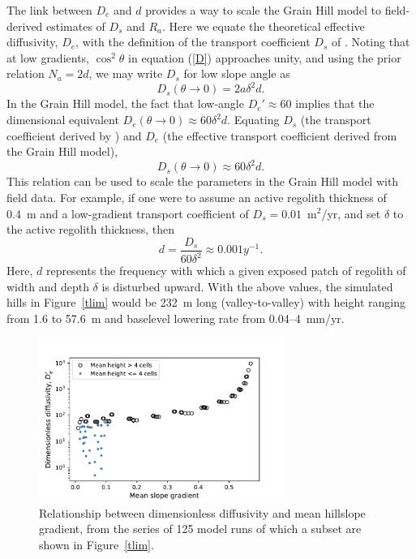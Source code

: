 \documentclass[esurf, manuscript]{copernicus}
\begin{document}
The link between $D_e$ and $d$ provides a way to scale the Grain Hill model to field-derived estimates of $D_s$ and $R_a$. Here we equate the theoretical effective diffusivity, $D_e$, with the definition of the transport coefficient $D_s$ of \citet{furbish2009statistical}. Noting that at low gradients, $\cos^2\theta$ in equation (\ref{D}) approaches unity, and using the prior relation $N_a=2d$, we may write $D_s$ for low slope angle as
\begin{equation}
D_s (\theta \rightarrow 0) = 2 a \delta^2 d.
\end{equation}
In the Grain Hill model, the fact that low-angle $D_e'\approx 60$ implies that the dimensional equivalent $D_e (\theta\rightarrow 0) \approx 60 \delta^2 d$. Equating $D_s$ (the transport coefficient derived by \citet{furbish2009statistical}) and $D_e$ (the effective transport coefficient derived from the Grain Hill model), 
\begin{equation}
D_s (\theta \rightarrow 0) \approx 60 \delta^2 d.
\label{Ds}
\end{equation}This relation can be used to scale the parameters in the Grain Hill model with field data. For example, if one were to assume an active regolith thickness of 0.4~m and a low-gradient transport coefficient of $D_s = 0.01$~m$^2$/yr, and set $\delta$ to the active regolith thickness, then
\begin{equation}
d = \frac{D_s} {60 \delta^2} \approx 0.001 y^{-1}.
\end{equation}
Here, $d$ represents the frequency with which a given exposed patch of regolith of width and depth $\delta$ is disturbed upward. With the above values, the simulated hills in Figure~\ref{tlim} would be 232~m long (valley-to-valley) with height ranging from 1.6 to 57.6~m and baselevel lowering rate from 0.04--4~mm/yr.

\begin{figure}[t]
\includegraphics[width=8cm]{Figures/dimless_diff_vs_grad.pdf}
\caption{Relationship between dimensionless diffusivity and mean hillslope gradient, from the series of 125 model runs of which a subset are shown in Figure~\ref{tlim}.}
\label{diffgrad}
\end{figure}
\end{document}
